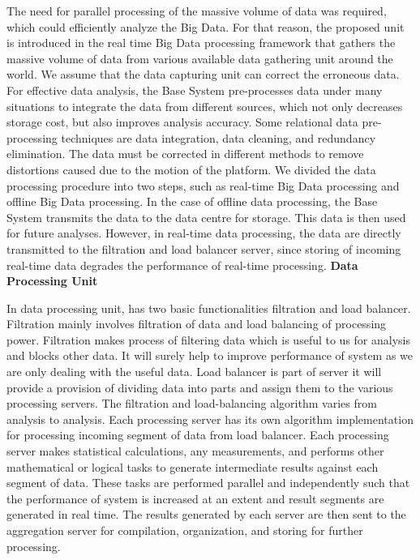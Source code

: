 \documentclass[oneside,a4paper,12pt]{book}
\begin{document}
\par The need for parallel processing of the massive volume of data was required, which could efficiently analyze the Big Data. For that reason, the proposed unit is introduced in the real time Big Data processing framework that gathers the massive volume of data from various available data gathering unit around the world. We assume that the data capturing unit can correct the erroneous data. For effective data analysis, the Base System pre-processes data under many situations to integrate the data from different sources, which not only decreases storage cost, but also improves analysis accuracy. Some relational data pre-processing techniques are data integration, data cleaning, and redundancy elimination. The data must be corrected in different methods to remove distortions caused due to the motion of the platform. We divided the data processing procedure into two steps, such as real-time Big Data processing and offline Big Data processing. In the case of offline data processing, the Base System transmits the data to the data centre for storage. This data is then used for future analyses. However, in real-time data processing, the data are directly transmitted to the filtration and load balancer server, since storing of incoming real-time data degrades the performance of real-time processing.
\newline 
\textbf{Data Processing Unit}
\par In data processing unit, has two basic functionalities filtration and load balancer. Filtration mainly involves filtration of data and load balancing of processing power. Filtration makes process of filtering data which is useful to us for analysis and blocks other data. It will surely help to improve performance of system as we are only dealing with the useful data. Load balancer is part of server it will provide a provision of dividing data into parts and assign them to the various processing servers. The filtration and load-balancing algorithm varies from analysis to analysis. Each processing server has its own algorithm implementation for processing incoming segment of data from load balancer. Each processing server makes statistical calculations, any measurements, and performs other mathematical or logical tasks to generate intermediate results against each segment of data. These tasks are performed parallel and independently such that the performance of system is increased at an extent and result segments are generated in real time. The results generated by each server are then sent to the aggregation server for compilation, organization, and storing for further processing.
\end{document}
